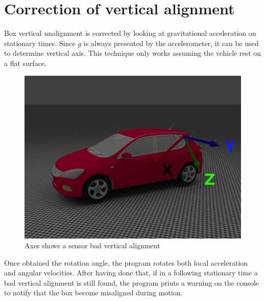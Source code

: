 \section{Correction of vertical alignment}
Box vertical unalignment is corrected by looking at gravitational acceleration on stationary times. Since $g$ is always presented by the accelerometer, it can be used to determine vertical axis. This technique only works assuming the vehicle rest on a flat surface. 
\begin{figure}[H]
\includegraphics[width=\textwidth]{kia_bad_z_align.jpg}
\caption{Axes shows a sensor bad vertical alignment}
\end{figure}
\justify
Once obtained the rotation angle, the program rotates both local acceleration and angular velocities. After having done that, if in a following stationary time a bad vertical alignment is still found, the program prints a warning on the console to notify that the box become misaligned during motion.

